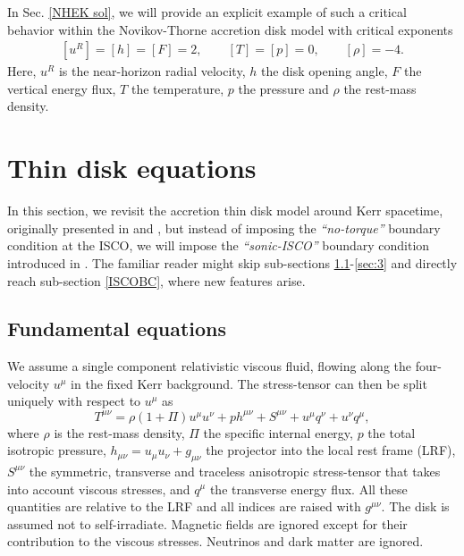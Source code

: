 \documentclass[a4paper,fleqn,usenatbib]{mnrasMOD}
\numberwithin{equation}{section}
\newcommand{\bea}{\begin{eqnarray}}
\newcommand{\eea}{\end{eqnarray}}
\newcommand{\be}{\begin{equation}}
\newcommand{\ee}{\end{equation}}
\begin{document}
In Sec. \ref{NHEK sol}, we will provide an explicit example of such a critical behavior within the Novikov-Thorne accretion disk model with critical exponents
\bea\label{cw}
 {}[ u^R]=[h]= [F]=2,\qquad [T]=[p]=0,\qquad [ \rho ]=-4.
\eea
Here, $u^R$ is the near-horizon radial velocity, $h$ the disk opening angle, $F$ the vertical energy flux, $T$ the temperature, $p$ the pressure and $\rho$ the rest-mass density.

\section{Thin disk equations} \label{sec:disk}
In this section, we revisit the accretion thin disk model around Kerr spacetime, originally presented in \cite{25334} and \cite{25341}, but instead of imposing the \emph{``no-torque''} boundary condition at the ISCO, we will impose the \emph{``sonic-ISCO''} boundary condition introduced in \cite{Penna:2011rw}. The familiar reader might skip sub-sections \ref{sec:1}-\ref{sec:3} and directly reach sub-section \ref{ISCOBC}, where new features arise. 

\subsection{Fundamental equations}\label{sec:1}
We assume a single component relativistic viscous fluid, flowing along the four-velocity $u^{\mu}$ in the fixed Kerr background. 
The stress-tensor can then be split uniquely with respect to $u^\mu$ as 
\be
T^{\mu\nu} = \rho (1+\Pi) u^{\mu}u^{\nu} + p h^{\mu\nu} + S^{\mu\nu} + u^{\mu}q^{\nu} + u^{\nu}q^{\mu},
\ee
where $\rho$ is the rest-mass density, $\Pi$ the specific internal energy, $p$ the total isotropic pressure, $h_{\mu\nu}= u_{\mu}u_{\nu} + g_{\mu\nu}$ the projector into the local rest frame (LRF), $S^{\mu\nu}$ the symmetric, transverse and traceless anisotropic stress-tensor that takes into account viscous stresses, and $q^{\mu}$ the transverse energy flux. All these quantities are relative to the LRF and all indices are raised with $g^{\mu\nu}$. 
The disk is assumed not to self-irradiate. Magnetic fields are ignored except for their contribution to the viscous stresses. Neutrinos and dark matter are ignored.
\end{document}
